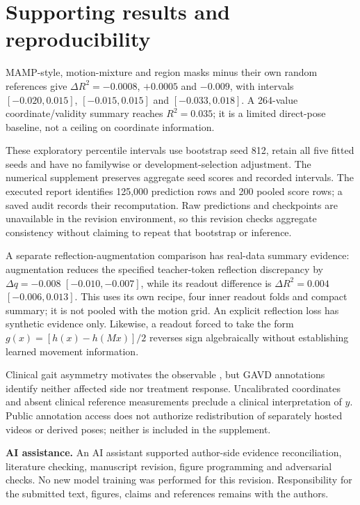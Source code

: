 \documentclass{article}
\begin{document}
\section{Supporting results and
reproducibility}\label{supporting-results-and-reproducibility}

MAMP-style, motion-mixture and region masks minus their own random
references give \(\Delta R^2=-0.0008\), \(+0.0005\) and \(-0.009\), with
intervals \([-0.020,0.015]\), \([-0.015,0.015]\) and \([-0.033,0.018]\).
A 264-value coordinate/validity summary reaches \(R^2=0.035\); it is a
limited direct-pose baseline, not a ceiling on coordinate information.

These exploratory percentile intervals use bootstrap seed 812, retain
all five fitted seeds and have no familywise or development-selection
adjustment. The numerical supplement preserves aggregate seed scores and
recorded intervals. The executed report identifies 125,000 prediction
rows and 200 pooled score rows; a saved audit records their
recomputation. Raw predictions and checkpoints are unavailable in the
revision environment, so this revision checks aggregate consistency
without claiming to repeat that bootstrap or inference.

A separate reflection-augmentation comparison has real-data summary
evidence: augmentation reduces the specified teacher-token reflection
discrepancy by \(\Delta q=-0.008\) \([-0.010,-0.007]\), while its
readout difference is \(\Delta R^2=0.004\) \([-0.006,0.013]\). This uses
its own recipe, four inner readout folds and compact summary; it is not
pooled with the motion grid. An explicit reflection loss has synthetic
evidence only. Likewise, a readout forced to take the form
\(g(x)=[h(x)-h(Mx)]/2\) reverses sign algebraically without establishing
learned movement information.

Clinical gait asymmetry motivates the observable \citep{stroke}, but
GAVD annotations identify neither affected side nor treatment response.
Uncalibrated coordinates and absent clinical reference measurements
preclude a clinical interpretation of \(y\). Public annotation access
does not authorize redistribution of separately hosted videos or derived
poses; neither is included in the supplement.

\textbf{AI assistance.} An AI assistant supported author-side evidence
reconciliation, literature checking, manuscript revision, figure
programming and adversarial checks. No new model training was performed
for this revision. Responsibility for the submitted text, figures,
claims and references remains with the authors.
\end{document}
